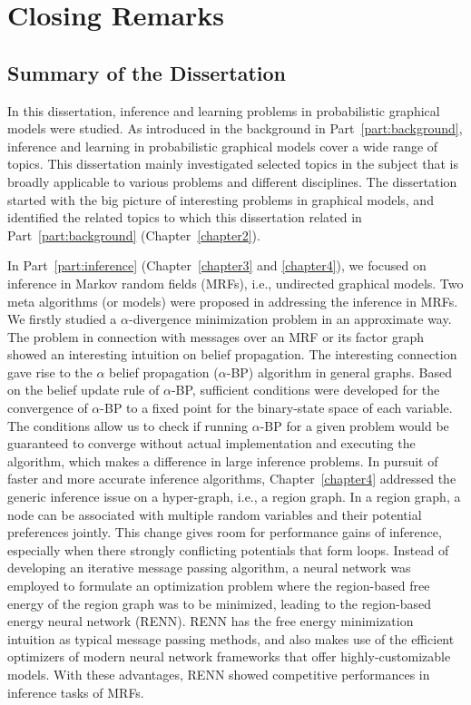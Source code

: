 \chapter{Closing Remarks}
\label{chapter9}

\section{Summary of the Dissertation}
In this dissertation, inference and learning problems in probabilistic graphical models were studied. As introduced in the background in Part~\ref{part:background}, inference and learning in probabilistic graphical models cover a wide range of topics. This dissertation mainly investigated selected topics in the subject that is broadly applicable to various problems and different disciplines. The dissertation started with the big picture of interesting problems in graphical models, and identified the related topics to which this dissertation related in Part~\ref{part:background} (Chapter~\ref{chapter2}).

In Part~\ref{part:inference} (Chapter~\ref{chapter3} and \ref{chapter4}), we focused on inference in Markov random fields (MRFs), i.e., undirected graphical models. Two meta algorithms (or models) were proposed in addressing the inference in MRFs. We firstly studied a $\alpha$-divergence minimization problem in an approximate way. The problem in connection with messages over an MRF or its factor graph showed an interesting intuition on belief propagation. The interesting connection gave rise to the $\alpha$ belief propagation ($\alpha$-BP) algorithm in general graphs. Based on the belief update rule of $\alpha$-BP, sufficient conditions were developed for the convergence of $\alpha$-BP to a fixed point for the binary-state space of each variable. The conditions allow us to check if running $\alpha$-BP for a given problem would be guaranteed to converge without actual implementation and executing the algorithm, which makes a difference in large inference problems. In pursuit of faster and more accurate inference algorithms, Chapter~\ref{chapter4} addressed the generic inference issue on a hyper-graph, i.e., a region graph. In a region graph, a node can be associated with multiple random variables and their potential preferences jointly. This change gives room for performance gains of inference, especially when there strongly conflicting potentials that form loops. Instead of developing an iterative message passing algorithm, a neural network was employed to formulate an optimization problem where the region-based free energy of the region graph was to be minimized, leading to the region-based energy neural network (RENN). RENN has the free energy minimization intuition as typical message passing methods, and also makes use of the efficient optimizers of modern neural network frameworks that offer highly-customizable models. With these advantages, RENN showed competitive performances in inference tasks of MRFs.

